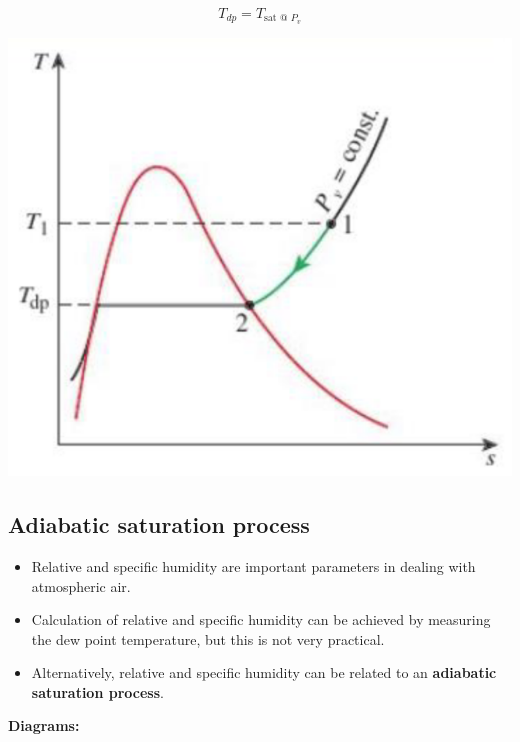 \documentclass[11pt]{article}
\begin{document}
\[T_{dp} = T_{\text{sat @ } P_v}\]

\begin{center}
\includegraphics[width=.9\linewidth]{./images/dew-point-temperature-t-s-diagram.png}
\end{center}

 \newpage
\subsection{Adiabatic saturation process}
\label{sec:org24428ba}
\begin{itemize}
\item Relative and specific humidity are important parameters in dealing with atmospheric air.
\item Calculation of relative and specific humidity can be achieved by measuring the dew point temperature, but this is not very practical.
\item Alternatively, relative and specific humidity can be related to an \textbf{adiabatic saturation process}.
\end{itemize}

\textbf{Diagrams:}
\end{document}
